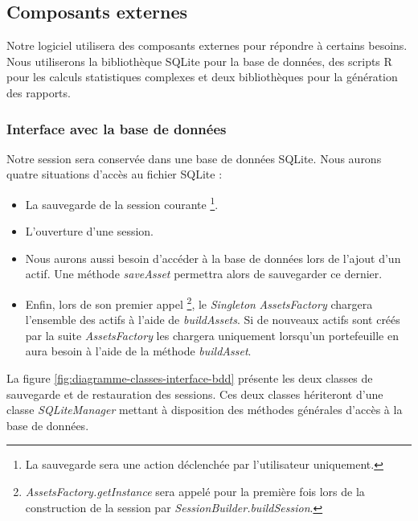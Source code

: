 \documentclass[a4paper,titlepage,french]{report}
\begin{document}
\subsection{Composants externes}

Notre logiciel utilisera des composants externes pour répondre à certains besoins.
Nous utiliserons la bibliothèque SQLite pour la base de données, des scripts R pour les calculs statistiques complexes et deux bibliothèques pour la génération des rapports.

\subsubsection{Interface avec la base de données}

Notre session sera conservée dans une base de données SQLite.
Nous aurons quatre situations d'accès au fichier SQLite :

\begin{itemize}
	\item La sauvegarde de la session courante \footnote{La sauvegarde sera une action déclenchée par l'utilisateur uniquement.}.
  	\item L'ouverture d'une session.
  	\item Nous aurons aussi besoin d'accéder à la base de données lors de l'ajout d'un actif.
	Une méthode \textit{saveAsset} permettra alors de sauvegarder ce dernier.
  	\item Enfin, lors de son premier appel \footnote{\textit{AssetsFactory.getInstance} sera appelé pour la première fois lors de la construction de la session par \textit{SessionBuilder.buildSession}.}, le \textit{Singleton} \textit{AssetsFactory} chargera l'ensemble des actifs à l'aide de \textit{buildAssets}.
	Si de nouveaux actifs sont créés par la suite \textit{AssetsFactory} les chargera uniquement lorsqu'un portefeuille en aura besoin à l'aide de la méthode \textit{buildAsset}.
\end{itemize}

La figure \ref{fig:diagramme-classes-interface-bdd} présente les deux classes de sauvegarde et de restauration des sessions. Ces deux classes hériteront d'une classe \textit{SQLiteManager} mettant à disposition des méthodes générales d'accès à la base de données.
\end{document}
